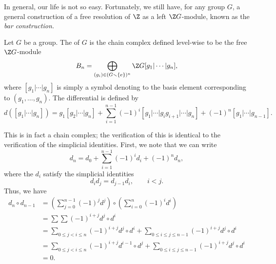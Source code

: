 \documentclass[main.tex]{subfiles}
\begin{document}
In general, our life is not so easy. Fortunately, we still have, for any group $G$, a general construction of a free resolution of $\Z$ as a left $\Z G$-module, known as the \emph{bar construction.}

\begin{definition}
  \label{def:bar_complex}
  Let $G$ be a group. The  of $G$ is the chain complex defined level-wise to be the free $\Z G$-module
  \begin{equation*}
    B_{n} = \bigoplus_{(g_{i}) \in (G \smallsetminus \{e\})^{n}} \Z G[g_{1} | \cdots | g_{n}],
  \end{equation*}
  where $[g_{1} | \cdots | g_{n}]$ is simply a symbol denoting to the basis element corresponding to $(g_{1}, \dots, g_{n})$. The differential is defined by
  \begin{equation*}
    d([g_{1} | \cdots | g_{n}]) = g_{1}[g_{2} | \cdots | g_{n}] + \sum_{i = 1}^{n - 1} (-1)^{i} [g_{1} | \cdots | g_{i}g_{i+1} | \cdots | g_{n}] + (-1)^{n}[g_{1} | \cdots | g_{n-1}].
  \end{equation*}
\end{definition}

This is in fact a chain complex; the verification of this is identical to the verification of the simplicial identities. First, we note that we can write
\begin{equation*}
  d_{n} = d_{0} + \sum_{i = 1}^{n-1} (-1)^{i} d_{i} + (-1)^{n}d_{n},
\end{equation*}
where the $d_{i}$ satisfy the simplicial identities
\begin{equation*}
  d_{i}d_{j} = d_{j-1}d_{i},\qquad i < j.
\end{equation*}
Thus, we have
\begin{align*}
  d_{n} \circ d_{n-1} &= \left( \sum_{j = 0}^{n-1}(-1)^{j}d^{j} \right) \circ \left( \sum_{i = 0}^{n}(-1)^{i}d^{i} \right) \\
  &= \sum\sum (-1)^{i+j} d^{j} \circ d^{i} \\
  &= \sum_{0 \leq j < i \leq n} (-1)^{i+j} d^{j} \circ d^{i} + \sum_{0 \leq i \leq j \leq n-1} (-1)^{i+j} d^{j} \circ d^{i} \\
  &= \sum_{0 \leq j < i \leq n} (-1)^{i+j} d^{i-1} \circ d^{j} + \sum_{0 \leq i \leq j \leq n-1} (-1)^{i+j} d^{j} \circ d^{i} \\
  &= 0.
\end{align*}
\end{document}
